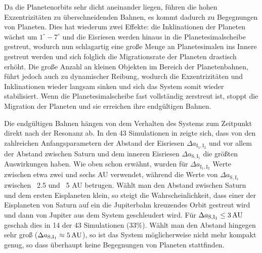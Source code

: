 \documentclass[12pt,a4paper,twoside]{article}
\renewcommand{\cite}{\citep}
\begin{document}
Da die Planetenorbits sehr dicht aneinander liegen, führen die hohen Exzentrizitäten zu überschneidenden Bahnen\cite{Tsiganis2005}, es kommt dadurch zu Begegnungen von Planeten. %
Dies hat wiederum zwei Effekte: die Inklinationen der Planeten wächst um $1^\circ-7^\circ$ und die Eisriesen werden hinaus in die Planetesimalscheibe gestreut,
wodurch nun schlagartig eine große Menge an Planetesimalen ins Innere gestreut werden und sich folglich die Migrationsrate der Planeten drastisch erhöht\cite{Tsiganis2005}.
Die große Anzahl an kleinen Objekten im Bereich der Planetenbahnen, führt jedoch auch zu dynamischer Reibung, %
wodurch die Exzentrizitäten und Inklinationen wieder langsam sinken und sich das System somit wieder stabilisiert\cite{Tsiganis2005}.
Wenn die Planetesimalscheibe fast vollständig zerstreut ist, stoppt die Migration der Planeten und sie erreichen ihre endgültigen Bahnen\cite{Tsiganis2005}.

\newcommand{\DII}{\Delta a_{\mathrm{I}_1,\mathrm{I}_2}}
\newcommand{\DSI}{\Delta a_{\mathrm{S},\mathrm{I}_1}} %
Die endgültigen Bahnen hängen von dem Verhalten des Systems zum Zeitpunkt direkt nach der Resonanz ab. In den 43 Simulationen in \cite{Tsiganis2005} zeigte sich, dass von den zahlreichen Anfangsparametern der Abstand der Eisriesen $\DII$ und vor allem der Abstand zwischen Saturn und dem inneren Eisriesen $\DSI$ die größten Auswirkungen haben\cite{Tsiganis2005}.
Wie oben schon erwähnt, wurden für $\DII$ Werte zwischen etwa zwei und sechs AU verwendet, während die Werte von $\DSI$ zwischen ~2.5 und ~5 AU betrugen\cite{Tsiganis2005}.
Wählt man den Abstand zwischen Saturn und dem ersten Eisplaneten klein, so steigt die Wahrscheinlichkeit, dass einer der Eisplaneten von Saturn auf ein die Jupiterbahn kreuzendes Orbit gestreut wird und dann von Jupiter aus dem System geschleudert wird. Für $\DSI \le \unit[3]{AU} $ geschah dies in 14 der 43 Simulationen (33\%).
Wählt man den Abstand hingegen sehr groß ($\DSI \approx \unit[5]{AU}$), so ist das System möglicherweise nicht mehr kompakt genug, so dass überhaupt keine Begegnungen von Planeten stattfinden. %
\end{document}
